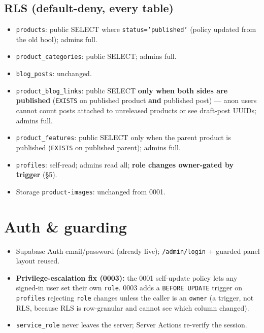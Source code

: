 \documentclass[11pt,a4paper]{article}
\begin{document}
\subsection{RLS (default-deny, every table)}
\begin{itemize}
  \item \texttt{products}: public SELECT where \texttt{status='published'} (policy updated
        from the old bool); admins full.
  \item \texttt{product\_categories}: public SELECT; admins full.
  \item \texttt{blog\_posts}: unchanged.
  \item \texttt{product\_blog\_links}: public SELECT \textbf{only when both sides are
        published} (\texttt{EXISTS} on published product \textbf{and} published post) --- anon
        users cannot count posts attached to unreleased products or see draft-post UUIDs;
        admins full.
  \item \texttt{product\_features}: public SELECT only when the parent product is
        published (\texttt{EXISTS} on published parent); admins full.
  \item \texttt{profiles}: self-read; admins read all; \textbf{role changes owner-gated by
        trigger} (\S5).
  \item Storage \texttt{product-images}: unchanged from 0001.
\end{itemize}

\section{Auth \& guarding}
\begin{itemize}
  \item Supabase Auth email/password (already live); \texttt{/admin/login} + guarded panel
        layout reused.
  \item \textbf{Privilege-escalation fix (0003):} the 0001 self-update policy lets any
        signed-in user set their own \texttt{role}. 0003 adds a \texttt{BEFORE UPDATE}
        trigger on \texttt{profiles} rejecting \texttt{role} changes unless the caller is an
        \texttt{owner} (a trigger, not RLS, because RLS is row-granular and cannot see which
        column changed).
  \item \texttt{service\_role} never leaves the server; Server Actions re-verify the session.
\end{itemize}
\end{document}
